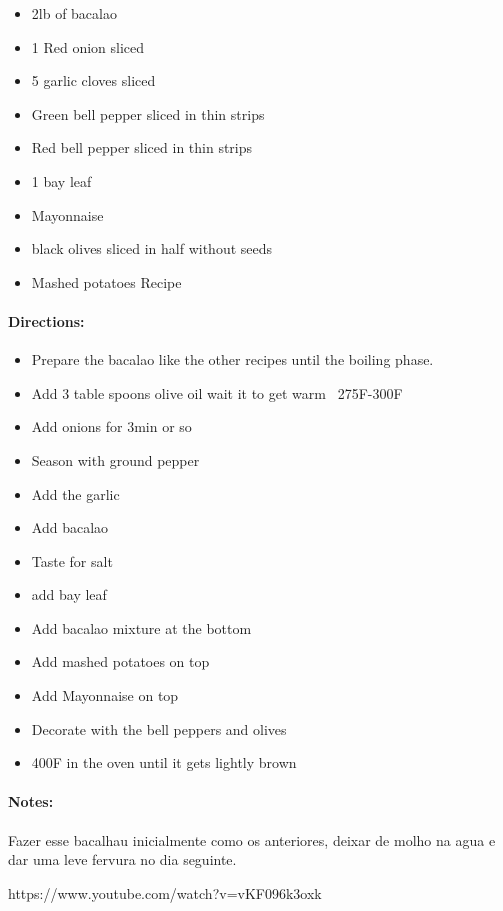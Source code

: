 \documentclass{article}
\begin{document}
\begin{itemize}
	\item 2lb of bacalao
	\item 1 Red onion sliced
	\item 5 garlic cloves sliced
	\item Green bell pepper sliced in thin strips
	\item Red bell pepper sliced in thin strips
	\item 1 bay leaf
	\item Mayonnaise
	\item black olives sliced in half without seeds
	\item Mashed potatoes Recipe
\end{itemize}

\paragraph{Directions:}
\begin{itemize}
	\item Prepare the bacalao like the other recipes until the boiling phase.
	\item Add 3 table spoons olive oil wait it to get warm ~275F-300F
	\item Add onions for 3min or so
	\item Season with ground pepper
	\item Add the garlic
	\item Add bacalao
	\item Taste for salt
	\item add bay leaf
	\item Add bacalao mixture at the bottom
	\item Add mashed potatoes on top
	\item Add Mayonnaise on top
	\item Decorate with the bell peppers and olives
	\item 400F in the oven until it gets lightly brown
\end{itemize}

\paragraph{Notes:}

Fazer esse bacalhau inicialmente como os anteriores, deixar de molho na agua e dar uma leve fervura no dia seguinte.

https://www.youtube.com/watch?v=vKF096k3oxk
\end{document}
